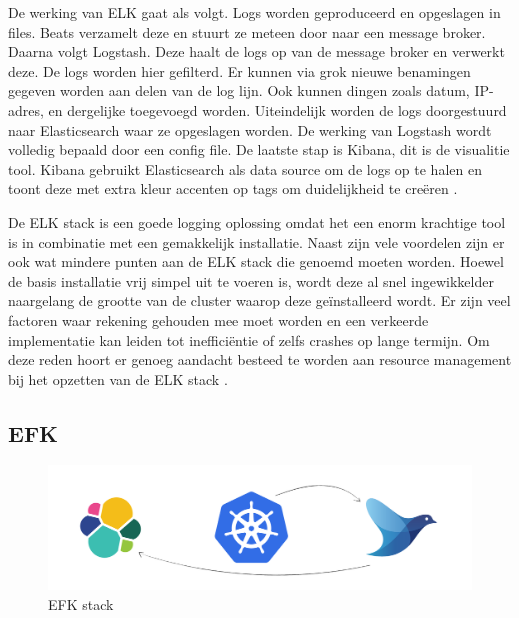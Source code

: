 De werking van ELK gaat als volgt. Logs worden geproduceerd en opgeslagen in files. Beats verzamelt deze en stuurt ze meteen door naar een message broker. Daarna volgt Logstash. Deze haalt de logs op van de message broker en verwerkt deze. De logs worden hier gefilterd. Er kunnen via grok nieuwe benamingen gegeven worden aan delen van de log lijn. Ook kunnen dingen zoals datum, IP-adres, en dergelijke toegevoegd worden. Uiteindelijk worden de logs doorgestuurd naar Elasticsearch waar ze opgeslagen worden. De werking van Logstash wordt volledig bepaald door een config file. De laatste stap is Kibana, dit is de visualitie tool. Kibana gebruikt Elasticsearch als data source om de logs op te halen en toont deze met extra kleur accenten op tags om duidelijkheid te creëren \cite{levy2015,berman2018-12}. 

De ELK stack is een goede logging oplossing omdat het een enorm krachtige tool is in combinatie met een gemakkelijk installatie. Naast zijn vele voordelen zijn er ook wat mindere punten aan de ELK stack die genoemd moeten worden. Hoewel de basis installatie vrij simpel uit te voeren is, wordt deze al snel ingewikkelder naargelang de grootte van de cluster waarop deze geïnstalleerd wordt. Er zijn veel factoren waar rekening gehouden mee moet worden en een verkeerde implementatie kan leiden tot inefficiëntie of zelfs crashes op lange termijn. Om deze reden hoort er genoeg aandacht besteed te worden aan resource management bij het opzetten van de ELK stack \autocite{gifford2016}.

\subsection{EFK}
\label{subsec:EFK}

\begin{figure}[ht]
    \centering
    \includegraphics[scale=0.15 ]{img/EFK_logo}
    \caption[EFK stack]{EFK stack \cite{petrausch}}
\end{figure}

